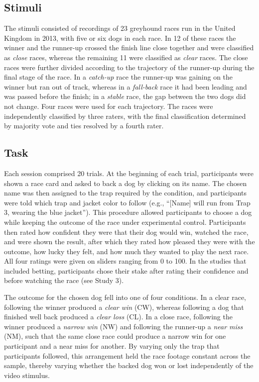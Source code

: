 \documentclass[man,floatsintext,donotrepeattitle]{apa7}
\begin{document}
\subsection{Stimuli}
The stimuli consisted of recordings of 23 greyhound races run in the United Kingdom in 2013, with five or six dogs in each race. In 12 of these races the winner and the runner-up crossed the finish line close together and were classified as \emph{close} races, whereas the remaining 11 were classified as \emph{clear} races. The close races were further divided according to the trajectory of the runner-up during the final stage of the race. In a \emph{catch-up} race the runner-up was gaining on the winner but ran out of track, whereas in a \emph{fall-back} race it had been leading and was passed before the finish; in a \emph{stable} race, the gap between the two dogs did not change. Four races were used for each trajectory. The races were independently classified by three raters, with the final classification determined by majority vote and ties resolved by a fourth rater. 

\subsection{Task}
Each session comprised 20 trials. At the beginning of each trial, participants were shown a race card and asked to back a dog by clicking on its name. The chosen name was then assigned to the trap required by the condition, and participants were told which trap and jacket color to follow (e.g., ``[Name] will run from Trap 3, wearing the blue jacket''). This procedure allowed participants to choose a dog while keeping the outcome of the race under experimental control. Participants then rated how confident they were that their dog would win, watched the race, and were shown the result, after which they rated how pleased they were with the outcome, how lucky they felt, and how much they wanted to play the next race. All four ratings were given on sliders ranging from 0 to 100. In the studies that included betting, participants chose their stake after rating their confidence and before watching the race (see Study 3).

The outcome for the chosen dog fell into one of four conditions. In a clear race, following the winner produced a \emph{clear win} (CW), whereas following a dog that finished well back produced a \emph{clear loss} (CL). In a close race, following the winner produced a \emph{narrow win} (NW) and following the runner-up a \emph{near miss} (NM), such that the same close race could produce a narrow win for one participant and a near miss for another. By varying only the trap that participants followed, this arrangement held the race footage constant across the sample, thereby varying whether the backed dog won or lost independently of the video stimulus.
\end{document}
